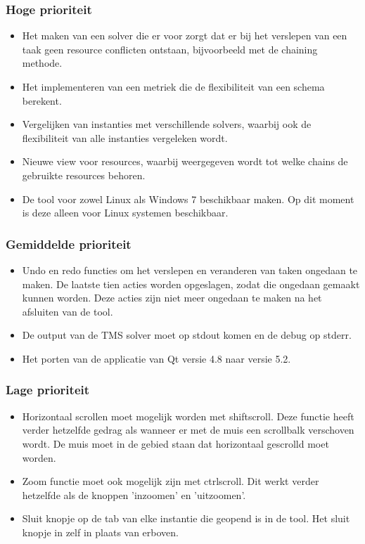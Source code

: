 \subsubsection*{Hoge prioriteit}
\begin{itemize}
	\item Het maken van een solver die er voor zorgt dat er bij het verslepen van een taak geen resource conflicten ontstaan, bijvoorbeeld met de chaining methode.
	\item Het implementeren van een metriek die de flexibiliteit van een schema berekent.
	\item Vergelijken van instanties met verschillende solvers, waarbij ook de flexibiliteit van alle instanties vergeleken wordt.
	\item Nieuwe view voor resources, waarbij weergegeven wordt tot welke chains de gebruikte resources behoren.
	\item De tool voor zowel Linux als Windows 7 beschikbaar maken. Op dit moment is deze alleen voor Linux systemen beschikbaar.
\end{itemize}

\subsubsection*{Gemiddelde prioriteit}
\begin{itemize}
	\item Undo en redo functies om het verslepen en veranderen van taken ongedaan te maken. De laatste tien acties worden opgeslagen, zodat die ongedaan gemaakt kunnen worden. Deze acties zijn niet meer ongedaan te maken na het afsluiten van de tool.
	\item De output van de TMS solver moet op stdout komen en de debug op stderr.
	\item Het porten van de applicatie van Qt versie 4.8 naar versie 5.2.
\end{itemize}

\subsubsection*{Lage prioriteit}
\begin{itemize}
	\item Horizontaal scrollen moet mogelijk worden met shift\plus scroll. Deze functie heeft verder hetzelfde gedrag als wanneer er met de muis een scrollbalk verschoven wordt. De muis moet in de gebied staan dat horizontaal gescrolld moet worden. 
	\item Zoom functie moet ook mogelijk zijn met ctrl\plus scroll. Dit werkt verder hetzelfde als de knoppen 'inzoomen' en 'uitzoomen'.
	\item Sluit knopje op de tab van elke instantie die geopend is in de tool. Het sluit knopje in  zelf in plaats van erboven.
\end{itemize}


